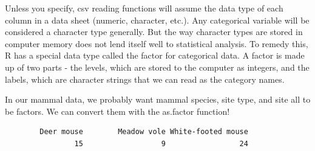 \documentclass[
  letterpaper,
  DIV=11,
  numbers=noendperiod]{scrreprt}
\newenvironment{Shaded}{\begin{snugshade}}{\end{snugshade}}
\newcommand{\DocumentationTok}[1]{\textcolor[rgb]{0.37,0.37,0.37}{\textit{#1}}}
\newcommand{\FunctionTok}[1]{\textcolor[rgb]{0.28,0.35,0.67}{#1}}
\newcommand{\NormalTok}[1]{\textcolor[rgb]{0.00,0.23,0.31}{#1}}
\newcommand{\OtherTok}[1]{\textcolor[rgb]{0.00,0.23,0.31}{#1}}
\newcommand{\SpecialCharTok}[1]{\textcolor[rgb]{0.37,0.37,0.37}{#1}}
\begin{document}
Unless you specify, csv reading functions will assume the data type of
each column in a data sheet (numeric, character, etc.). Any categorical
variable will be considered a character type generally. But the way
character types are stored in computer memory does not lend itself well
to statistical analysis. To remedy this, R has a special data type
called the factor for categorical data. A factor is made up of two parts
- the levels, which are stored to the computer as integers, and the
labels, which are character strings that we can read as the category
names.

In our mammal data, we probably want mammal species, site type, and site
all to be factors. We can convert them with the as.factor function!

\begin{Shaded}
\end{Shaded}

\begin{verbatim}
        Deer mouse        Meadow vole White-footed mouse 
                15                  9                 24 
\end{verbatim}

\begin{Shaded}
\end{Shaded}
\end{document}
